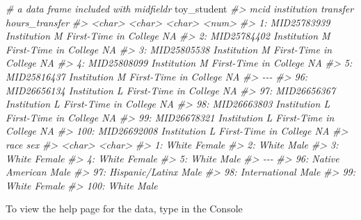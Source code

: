 \documentclass[
]{book}
\newenvironment{Shaded}{\begin{snugshade}}{\end{snugshade}}
\newcommand{\CommentTok}[1]{\textcolor[rgb]{0.56,0.35,0.01}{\textit{#1}}}
\newcommand{\NormalTok}[1]{#1}
\begin{document}
\begin{Shaded}
\begin{Highlighting}[]
\CommentTok{\# a data frame included with midfieldr}
\NormalTok{toy\_student}
\CommentTok{\#\textgreater{}             mcid   institution              transfer hours\_transfer}
\CommentTok{\#\textgreater{}           \textless{}char\textgreater{}        \textless{}char\textgreater{}                \textless{}char\textgreater{}          \textless{}num\textgreater{}}
\CommentTok{\#\textgreater{}   1: MID25783939 Institution M First{-}Time in College             NA}
\CommentTok{\#\textgreater{}   2: MID25784402 Institution M First{-}Time in College             NA}
\CommentTok{\#\textgreater{}   3: MID25805538 Institution M First{-}Time in College             NA}
\CommentTok{\#\textgreater{}   4: MID25808099 Institution M First{-}Time in College             NA}
\CommentTok{\#\textgreater{}   5: MID25816437 Institution M First{-}Time in College             NA}
\CommentTok{\#\textgreater{}  {-}{-}{-}                                                               }
\CommentTok{\#\textgreater{}  96: MID26656134 Institution L First{-}Time in College             NA}
\CommentTok{\#\textgreater{}  97: MID26656367 Institution L First{-}Time in College             NA}
\CommentTok{\#\textgreater{}  98: MID26663803 Institution L First{-}Time in College             NA}
\CommentTok{\#\textgreater{}  99: MID26678321 Institution L First{-}Time in College             NA}
\CommentTok{\#\textgreater{} 100: MID26692008 Institution L First{-}Time in College             NA}
\CommentTok{\#\textgreater{}                 race    sex}
\CommentTok{\#\textgreater{}               \textless{}char\textgreater{} \textless{}char\textgreater{}}
\CommentTok{\#\textgreater{}   1:           White Female}
\CommentTok{\#\textgreater{}   2:           White   Male}
\CommentTok{\#\textgreater{}   3:           White Female}
\CommentTok{\#\textgreater{}   4:           White Female}
\CommentTok{\#\textgreater{}   5:           White   Male}
\CommentTok{\#\textgreater{}  {-}{-}{-}                       }
\CommentTok{\#\textgreater{}  96: Native American   Male}
\CommentTok{\#\textgreater{}  97: Hispanic/Latinx   Male}
\CommentTok{\#\textgreater{}  98:   International   Male}
\CommentTok{\#\textgreater{}  99:           White Female}
\CommentTok{\#\textgreater{} 100:           White   Male}
\end{Highlighting}
\end{Shaded}

To view the help page for the data, type in the Console
\end{document}
